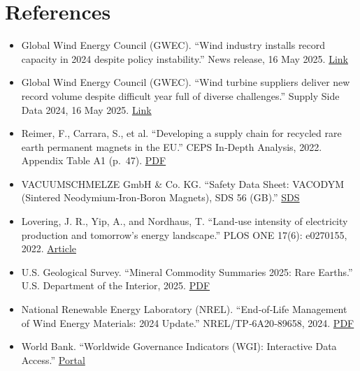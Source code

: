 \documentclass[11pt]{article}
\begin{document}
\section*{References}
\begin{itemize}
  \item[{[1]}] Global Wind Energy Council (GWEC). ``Wind industry installs record capacity in 2024 despite policy instability.'' News release, 16 May 2025. \href{https://www.gwec.net/gwec-news/wind-industry-installs-record-capacity-in-2024-despite-policy-instability}{Link}
  \item[{[2]}] Global Wind Energy Council (GWEC). ``Wind turbine suppliers deliver new record volume despite difficult year full of diverse challenges.'' Supply Side Data 2024, 16 May 2025. \href{https://www.gwec.net/gwec-news/wind-turbine-suppliers-deliver-new-record-volume-despite-difficult-year-full-of-diverse-challenges}{Link}
  \item[{[3]}] Reimer, F., Carrara, S., et al. ``Developing a supply chain for recycled rare earth permanent magnets in the EU.'' CEPS In‑Depth Analysis, 2022. Appendix Table A1 (p.~47). \href{https://cdn.ceps.eu/wp-content/uploads/2023/07/CEPS-In-depth-analysis-2022-07_Supply-chain-for-recycled-rare-earth-permanent-magnets-1.pdf}{PDF}
  \item[{[4]}] VACUUMSCHMELZE GmbH \& Co. KG. ``Safety Data Sheet: VACODYM \\(Sintered Neodymium‑Iron‑Boron Magnets), SDS 56 (GB).'' \href{https://www.vacuumschmelze.com/03_Documents/Quality/Material%20Safety%20Data%20Sheets/SDS%2056%20%20(GB).pdf}{SDS}
  \item[{[5]}] Lovering, J. R., Yip, A., and Nordhaus, T. ``Land‑use intensity of electricity production and tomorrow's energy landscape.'' PLOS ONE 17(6): e0270155, 2022. \href{https://journals.plos.org/plosone/article?id=10.1371/journal.pone.0270155}{Article}
  \item[{[6]}] U.S. Geological Survey. ``Mineral Commodity Summaries 2025: Rare Earths.'' U.S. Department of the Interior, 2025. \href{https://pubs.usgs.gov/periodicals/mcs2025/mcs2025.pdf}{PDF}
  \item[{[7]}] National Renewable Energy Laboratory (NREL). ``End‑of‑Life Management of Wind Energy Materials: 2024 Update.'' NREL/TP‑6A20‑89658, 2024. \href{https://docs.nrel.gov/docs/fy24osti/89658.pdf}{PDF}
  \item[{[8]}] World Bank. ``Worldwide Governance Indicators (WGI): Interactive Data Access.'' \href{https://www.worldbank.org/en/publication/worldwide-governance-indicators/interactive-data-access}{Portal}
\end{itemize}
\end{document}
